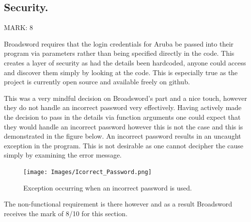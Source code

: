 \documentclass{article}
\begin{document}
\subsection{Security.}
\begin{flushleft}
MARK: 8
\end{flushleft}

\begin{flushleft}
Broadsword requires that the login credentials for Aruba be passed into their program via parameters rather than being specified directly in the code. This creates a layer of security as had the details been hardcoded, anyone could access and discover them simply by looking at the code. This is especially true as the project is currently open source and available freely on github.
\end{flushleft}

\begin{flushleft}
This was a very mindful decision on Broadsword’s part and a nice touch, however they do not handle an incorrect password very effectively. Having actively made the decision to pass in the details via function arguments one could expect that they would handle an incorrect password however this is not the case and this is demonstrated in the figure below. An incorrect password results in an uncaught exception in the program. This is not desirable as one cannot decipher the cause simply by examining the error message.
\end{flushleft}

\begin{figure}[ht]
  \texttt{[image: Images/Icorrect\_Password.png]}
  \caption{Exception occurring when an incorrect password is used.}
  \label{Terminal output.}  
\end{figure}

\begin{flushleft}
The non-functional requirement is there however and as a result Broadsword receives the mark of 8/10 for this section.
\end{flushleft}
\end{document}
